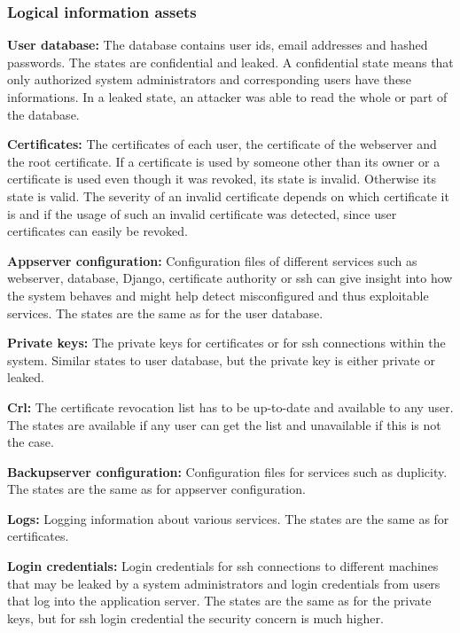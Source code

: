 \documentclass[english]{article}
\begin{document}
\subsubsection{Logical information assets}
	\begin{description}
		\item{\textbf{User database:}} The database contains user ids, email addresses and hashed passwords. The states are confidential and leaked. A confidential state means that only authorized system administrators and corresponding users have these informations. In a leaked state, an attacker was able to read the whole or part of the database.
		\item{\textbf{Certificates:}} The certificates of each user, the certificate of the webserver and the root certificate. If a certificate is used by someone other than its owner or a certificate is used even though it was revoked, its state is invalid. Otherwise its state is valid. The severity of an invalid certificate depends on which certificate it is and if the usage of such an invalid certificate was detected, since user certificates can easily be revoked.
		\item{\textbf{Appserver configuration:}} Configuration files of different services such as webserver, database, Django, certificate authority or ssh can give insight into how the system behaves and might help detect misconfigured and thus exploitable services. The states are the same as for the user database.
		\item{\textbf{Private keys:}} The private keys for certificates or for ssh connections within the system. Similar states to user database, but the private key is either private or leaked.
		\item{\textbf{Crl:}} The certificate revocation list has to be up-to-date and available to any user. The states are available if any user can get the list and unavailable if this is not the case.
		\item{\textbf{Backupserver configuration:}} Configuration files for services such as duplicity. The states are the same as for appserver configuration.
		\item{\textbf{Logs:}} Logging information about various services. The states are the same as for certificates.
		\item{\textbf{Login credentials:}} Login credentials for ssh connections to different machines that may be leaked by a system administrators and login credentials from users that log into the application server. The states are the same as for the private keys, but for ssh login credential the security concern is much higher.

\end{description}
\end{document}
